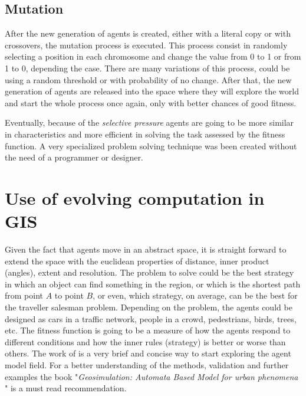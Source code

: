 \documentclass{article}
\begin{document}
\subsection{Mutation}
After the new generation of agents is created, either with a literal copy or with crossovers, the mutation process is executed. This process consist in randomly selecting a position in each chromosome and change the value from 0 to 1 or from 1 to 0, depending the case. There are many variations of this process, could be using a random threshold or with probability of no change. After that, the new generation of agents are released into the space where they will explore the world and start the whole process once again, only with better chances of good fitness.

Eventually, because of the {\em selective pressure} agents are going to be more similar in characteristics and more efficient in solving the task assessed by the fitness function. A very specialized problem solving technique was been created without the need of a programmer or designer.

\section{Use of evolving computation in GIS}
Given the fact that agents move in an abstract space, it is straight forward to extend the space with the euclidean properties of distance, inner product (angles), extent and resolution. The problem to solve could be the best strategy in which an object can find something in the region, or which is the shortest path from point $A$ to point $B$, or even, which strategy, on average, can be the best for the traveller salesman problem. Depending on the problem, the agents could be designed as cars in a traffic network, people in a crowd, pedestrians, birds, trees, etc. The fitness function is going to be a measure of how the agents respond to different conditions and how the inner rules (strategy) is better or worse than others. The work of \citet{abm_prin_conc} is a very brief and concise way to start exploring the agent model field. For a better understanding of the methods, validation and further examples the book "{\em Geosimulation: Automata Based Model for urban phenomena} \citep{geosimulation}" is a must read recommendation.  

 


\end{document}
